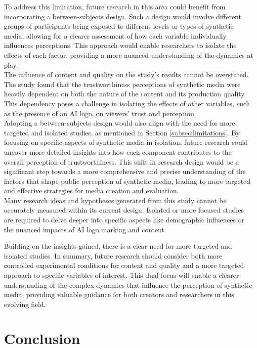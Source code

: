 \documentclass[
  a4paper,  %
  twoside,  %
  bibliography=totoc,
  headsepline,
  cleardoublepage=empty,
  parskip=half,
  draft=false
]{scrbook}
\begin{document}
To address this limitation, future research in this area could benefit from incorporating a between-subjects design. Such a design would involve different groups of participants being exposed to different levels or types of synthetic media, allowing for a clearer assessment of how each variable individually influences perceptions. This approach would enable researchers to isolate the effects of each factor, providing a more nuanced understanding of the dynamics at play. \\
The influence of content and quality on the study's results cannot be overstated. The study found that the trustworthiness perceptions of synthetic media were heavily dependent on both the nature of the content and its production quality. This dependency poses a challenge in isolating the effects of other variables, such as the presence of an AI logo, on viewers' trust and perception. \\
Adopting a between-subjects design would also align with the need for more targeted and isolated studies, as mentioned in Section \ref{subsec:limitations}. By focusing on specific aspects of synthetic media in isolation, future research could uncover more detailed insights into how each component contributes to the overall perception of trustworthiness. This shift in research design would be a significant step towards a more comprehensive and precise understanding of the factors that shape public perception of synthetic media, leading to more targeted and effective strategies for media creation and evaluation. \\

Many research ideas and hypotheses generated from this study cannot be accurately measured within its current design. Isolated or more focused studies are required to delve deeper into specific aspects like demographic influences or the nuanced impacts of AI logo marking and content.

Building on the insights gained, there is a clear need for more targeted and isolated studies. In summary, future research should consider both more controlled experimental conditions for content and quality and a more targeted approach to specific variables of interest. This dual focus will enable a clearer understanding of the complex dynamics that influence the perception of synthetic media, providing valuable guidance for both creators and researchers in this evolving field.

\chapter{Conclusion}
\label{chap:conclusion}
\end{document}
